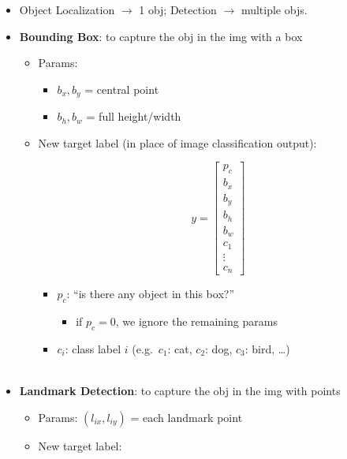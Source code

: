 \documentclass[
]{book}
\providecommand{\tightlist}{%
  \setlength{\itemsep}{0pt}\setlength{\parskip}{0pt}}
\begin{document}
\begin{itemize}
\item
  Object Localization \(\rightarrow\) 1 obj; Detection \(\rightarrow\)
  multiple objs.
\item
  \textbf{Bounding Box}: to capture the obj in the img with a box

  \begin{itemize}
  \item
    Params:

    \begin{itemize}
    \tightlist
    \item
      \(b_x, b_y\) = central point
    \item
      \(b_h, b_w\) = full height/width
    \end{itemize}
  \item
    New target label (in place of image classification output):

    \[\begin{equation}
      y=\begin{bmatrix}
      p_c \\ b_x \\ b_y \\ b_h \\ b_w \\ c_1 \\ \vdots \\ c_n
      \end{bmatrix}
      \end{equation}\]

    \begin{itemize}
    \tightlist
    \item
      \(p_c\): ``is there any object in this box?''

      \begin{itemize}
      \tightlist
      \item
        if \(p_c=0\), we ignore the remaining params
      \end{itemize}
    \item
      \(c_i\): class label \(i\) (e.g.~\(c_1\): cat, \(c_2\): dog,
      \(c_3\): bird, \ldots)\\
      ~\\
    \end{itemize}
  \end{itemize}
\item
  \textbf{Landmark Detection}: to capture the obj in the img with points

  \begin{itemize}
  \item
    Params: \((l_{ix},l_{iy})\) = each landmark point
  \item
    New target label:


\end{itemize}
\end{itemize}
\end{document}
